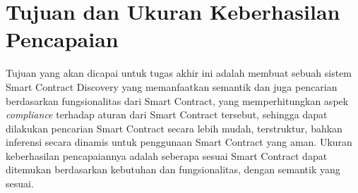 \section{Tujuan dan Ukuran Keberhasilan Pencapaian}
\label{sec:tujuan-ukuran-keberhasilan-pencapaian}


Tujuan yang akan dicapai untuk tugas akhir ini adalah membuat sebuah sistem Smart Contract Discovery yang memanfaatkan semantik dan juga pencarian berdasarkan fungsionalitas dari Smart Contract, yang memperhitungkan aspek \textit{compliance} terhadap aturan dari Smart Contract tersebut, sehingga dapat dilakukan pencarian Smart Contract secara lebih mudah, terstruktur, bahkan inferensi secara dinamis untuk penggunaan Smart Contract yang aman. Ukuran keberhasilan pencapaiannya adalah seberapa sesuai Smart Contract dapat ditemukan berdasarkan kebutuhan dan fungsionalitas, dengan semantik yang sesuai.